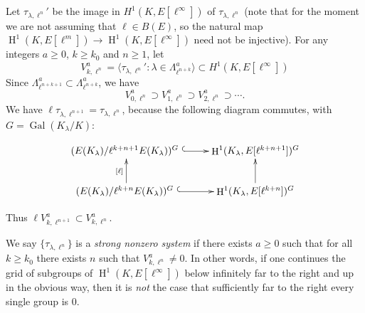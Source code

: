 \documentclass{oupau}
\DeclareMathOperator{\Gal}{Gal}
\DeclareMathOperator{\HH}{H}
\renewcommand{\H}{\HH}
\begin{document}
Let $\tau_{\lambda,\ell^n}'$ be the image in $H^1(K,E[\ell^\infty])$ 
of $\tau_{\lambda,\ell^n}$ (note that for the moment we are not
assuming that $\ell\in B(E)$, so the natural map
$\H^1(K,E[\ell^m]) \to \H^1(K,E[\ell^\infty])$ need not be injective).
For any integers $a\geq 0$, $k\geq k_0$ and $n\geq 1$, let
$$
  V_{k,\ell^n}^a = \langle \tau_{\lambda, \ell^n}' : \lambda \in \Lambda_{\ell^{n + k}}^a\rangle
    \subset H^1(K,E[\ell^\infty])
$$
Since $\Lambda_{\ell^{n+k+1}}^a \subset \Lambda_{\ell^{n+k}}^a$, we have
$$V_{0,\ell^n}^a \supset V_{1,\ell^n}^a \supset V_{2,\ell^n}^a \supset \cdots.$$
We have $\ell \tau_{\lambda,\ell^{n+1}} = \tau_{\lambda,\ell^n}$, because
the following diagram commutes, with $G=\Gal(K_{\lambda}/K)$:

$$
\xymatrix{
{(E(K_{\lambda})/\ell^{k+n+1}E(K_{\lambda}))^G\,\,}\ar@{^(->}[r] & {\H^1(K_{\lambda},E[\ell^{k+n+1}])^G}\\
{(E(K_{\lambda})/\ell^{k+n}E(K_{\lambda}))^G\,\,}\ar@{^(->}[r]\ar[u]^{[\ell]} & \H^1(K_{\lambda},E[\ell^{k+n}])^G\ar[u] \\
}
$$


Thus $\ell V_{k,\ell^{n+1}}^a \subset V_{k,\ell^n}^a$.

We say $\{\tau_{\lambda, \ell^n}\}$ is a {\em strong nonzero system} if
there exists $a\geq 0$ such that for all $k\geq k_0$ there
exists $n$ such that $V_{k,\ell^n}^a\neq 0$.  In other words,
if one continues the grid of subgroups of $\H^1(K,E[\ell^{\infty}])$
below infinitely far to the right and up in the obvious way, then it
is {\em not} the case that  sufficiently far to
the right every single group is 0.
\end{document}
